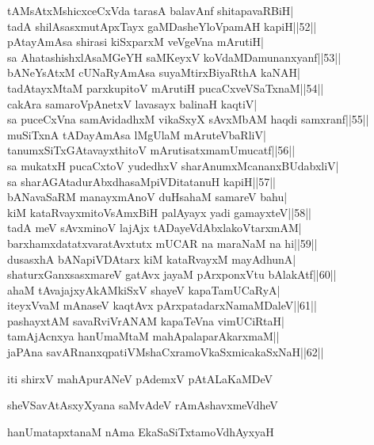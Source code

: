 \documentclass{article}
\begin{document}
tAMsAtxMshicxceCxVda tarasA balavAnf shitapavaRBiH|\\
tadA shilAsasxmutApxTayx gaMDasheYloVpamAH kapiH||52||\\
pAtayAmAsa shirasi kiSxparxM veVgeVna mArutiH|\\
sa AhatashishxlAsaMGeYH saMKeyxV koVdaMDamunanxyanf||53||\\
bANeYsAtxM cUNaRyAmAsa suyaMtirxBiyaRthA kaNAH|\\
tadAtayxMtaM parxkupitoV mArutiH pucaCxveVSaTxnaM||54||\\
cakAra samaroVpAnetxV lavasayx balinaH kaqtiV|\\
sa puceCxVna samAvidadhxM vikaSxyX sAvxMbAM haqdi samxranf||55||\\
muSiTxnA tADayAmAsa lMgUlaM mAruteVbaRliV|\\
tanumxSiTxGAtavayxthitoV mArutisatxmamUmucatf||56||\\
sa mukatxH pucaCxtoV yudedhxV sharAnumxMcananxBUdabxliV|\\
sa sharAGAtadurAbxdhasaMpiVDitatanuH kapiH||57||\\
bANavaSaRM manayxmAnoV duHsahaM samareV bahu|\\
kiM kataRvayxmitoVsAmxBiH palAyayx yadi gamayxteV||58||\\
tadA meV sAvxminoV lajAjx tADayeVdAbxlakoVtarxmAM|\\
barxhamxdatatxvaratAvxtutx mUCAR na maraNaM na hi||59||\\
dusasxhA bANapiVDAtarx kiM kataRvayxM mayAdhunA|\\
shaturxGanxsasxmareV gatAvx jayaM pArxponxVtu bAlakAtf||60||\\
ahaM tAvajajxyAkAMkiSxV shayeV kapaTamUCaRyA|\\
iteyxVvaM mAnaseV kaqtAvx pArxpatadarxNamaMDaleV||61||\\
pashayxtAM savaRviVrANAM kapaTeVna vimUCiRtaH|\\
tamAjAcnxya hanUmaMtaM mahApalaparAkarxmaM||\\
jaPAna savARnanxqpatiVMshaCxramoVkaSxmicakaSxNaH||62||\\

\begin{center}
iti shirxV mahApurANeV pAdemxV pAtALaKaMDeV
\end{center}

\begin{center}
sheVSavAtAsxyXyana saMvAdeV rAmAshavxmeVdheV
\end{center}

\begin{center}
hanUmatapxtanaM nAma EkaSaSiTxtamoVdhAyxyaH
\end{center}
\end{document}
